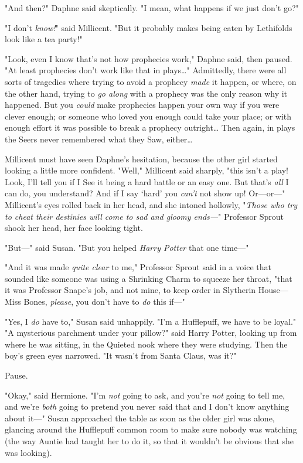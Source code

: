 "And then?" Daphne said skeptically. "I mean, what happens if we just don't go?"

"I don't \emph{know!}" said Millicent. "But it probably makes being eaten by
Lethifolds look like a tea party!"

"Look, even I know that's not how prophecies work," Daphne said, then paused.
"At least prophecies don't work like that in plays{\ldots}" Admittedly, there
were all sorts of tragedies where trying to avoid a prophecy \emph{made} it
happen, or where, on the other hand, trying to \emph{go along} with a prophecy
was the only reason why it happened. But you \emph{could} make prophecies
happen your own way if you were clever enough; or someone who loved you enough
could take your place; or with enough effort it was possible to break a
prophecy outright{\ldots} Then again, in plays the Seers never remembered what
they Saw, either{\ldots}

Millicent must have seen Daphne's hesitation, because the other girl started
looking a little more confident. "Well," Millicent said sharply, "this isn't a
play! Look, I'll tell you if I See it being a hard battle or an easy one. But
that's \emph{all} I can do, you understand? And if I say `hard' you
\emph{can't} not show up! Or---or---" Millicent's eyes rolled back in her head,
and she intoned hollowly, "\emph{Those who try to cheat their destinies will
come to sad and gloomy ends---}"
\later
Professor Sprout shook her head, her face looking tight.

"But---" said Susan. "But you helped \emph{Harry Potter} that one time---"

"And it was made \emph{quite clear} to me," Professor Sprout said in a voice
that sounded like someone was using a Shrinking Charm to squeeze her throat,
"that it was Professor Snape's job, and not mine, to keep order in Slytherin
House---Miss Bones, \emph{please}, you don't have to \emph{do} this if---"

"Yes, I \emph{do} have to," Susan said unhappily. "I'm a Hufflepuff, we have to
be loyal."
\later
"A mysterious parchment under your pillow?" said Harry Potter, looking up from
where he was sitting, in the Quieted nook where they were studying. Then the
boy's green eyes narrowed. "It wasn't from Santa Claus, was it?"

Pause.

"Okay," said Hermione. "I'm \emph{not} going to ask, and you're \emph{not}
going to tell me, and we're \emph{both} going to pretend you never said that
and I don't know anything about it---"
\later
Susan approached the table as soon as the older girl was alone, glancing around
the Hufflepuff common room to make sure nobody was watching (the way Auntie had
taught her to do it, so that it wouldn't be obvious that she was looking).

